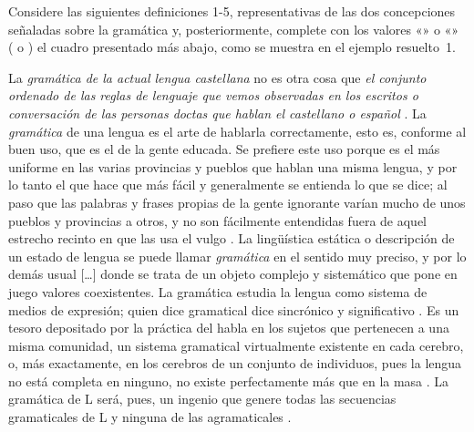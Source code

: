 \begin{ejercicio}\label{ej:02-definiciones}
Considere las siguientes definiciones 1-5, representativas de las dos
concepciones señaladas sobre la gramática y, posteriormente, complete con los
valores «\mas» o «\menos» ( o ) el cuadro presentado más abajo,
como se muestra en el ejemplo resuelto~1.

\begin{exe}
  \ex La \textit{gramática de la actual lengua castellana} no es otra cosa que
      \textit{el conjunto ordenado de las reglas de lenguaje que vemos
      observadas en los escritos o conversación de las personas doctas que
      hablan el castellano o español} \parencite[1]{salva1852}.
  \ex La \textit{gramática} de una lengua es el arte de hablarla correctamente,
      esto es, conforme al buen uso, que es el de la gente educada. Se prefiere
      este uso porque es el más uniforme en las varias provincias y pueblos que
      hablan una misma lengua, y por lo tanto el que hace que más fácil y
      generalmente se entienda lo que se dice; al paso que las palabras y frases
      propias de la gente ignorante varían mucho de unos pueblos y provincias a
      otros, y no son fácilmente entendidas fuera de aquel estrecho recinto en
      que las usa el vulgo \parencite[§§\,1-2]{bello2002}.
  \ex La lingüística estática o descripción de un estado de lengua se puede
      llamar \textit{gramática} en el sentido muy preciso, y por lo demás usual
      [\ldots] donde se trata de un objeto complejo y sistemático que pone en
      juego valores coexistentes. La gramática estudia la lengua como sistema
      de medios de expresión; quien dice gramatical dice sincrónico y
      significativo \parencite[223]{saussure1945}.
  \ex {[La lengua]} Es un tesoro depositado por la práctica del habla en los
      sujetos que pertenecen a una misma comunidad, un sistema gramatical
      virtualmente existente en cada cerebro, o, más exactamente, en los
      cerebros de un conjunto de individuos, pues la lengua no está completa en
      ninguno, no existe perfectamente más que en la masa
      \parencite[57]{saussure1945}.
  \ex La gramática de L será, pues, un ingenio que genere todas las secuencias
      gramaticales de L y ninguna de las agramaticales
      \parencite[27]{chomsky1974a}.
\end{exe}


\end{ejercicio}
